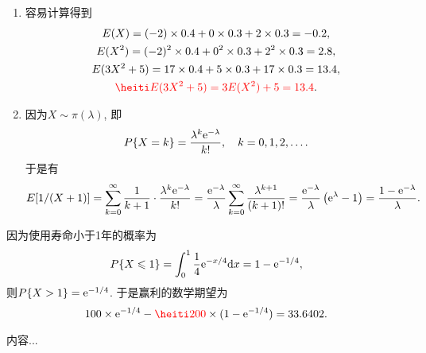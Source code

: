 \begin{prob}
	\begin{enumerate}
	\item 
	容易计算得到
	\begin{gather*}
		E(X)=(-2)\times 0.4+0\times 0.3+2\times 0.3=-0.2,\\
		E(X^2)=(-2)^2\times 0.4+0^2\times 0.3+2^2\times 0.3=2.8,\\
		E(3X^2+5)=17\times 0.4+5\times 0.3+17\times 0.3=13.4,\\
		\red{E(3X^2+5)=3E(X^2)+5=13.4}.
	\end{gather*}
	\item 
	因为$X\sim\pi(\lambda)$, 即
	\[
		P\{X=k\}=\frac{\lambda^k\mathrm{e}^{-\lambda}}{k!},\quad k=0,1,2,\ldots.
	\]
	于是有
	\[
		E[1/(X+1)]=\sum_{k=0}^\infty \frac{1}{k+1}\cdot\frac{\lambda^k\mathrm{e}^{-\lambda}}{k!}
		=\frac{\mathrm{e}^{-\lambda}}{\lambda}\sum_{k=0}^\infty \frac{\lambda^{k+1}}{(k+1)!}
		=\frac{\mathrm{e}^{-\lambda}}{\lambda}\left(\mathrm{e}^\lambda-1\right)=\frac{1-\mathrm{e}^{-\lambda}}{\lambda}.
	\]
	\end{enumerate}
\end{prob}
\setcounter{prob}{10}
\begin{prob}
	因为使用寿命小于1年的概率为
	\[
		P\{X\leqslant 1\}=\int_0^1\frac{1}{4}\mathrm{e}^{-x/4}\mathrm{d} x=1-\mathrm{e}^{-1/4}, 
	\]
	则$P\{X>1\}=\mathrm{e}^{-1/4}$. 于是赢利的数学期望为
	\[
		100\times\e^{-1/4}-\red{200}\times(1-\e^{-1/4})=33.6402.
	\]
\end{prob}
\setcounter{prob}{15}
\begin{prob}
	内容...
\end{prob}